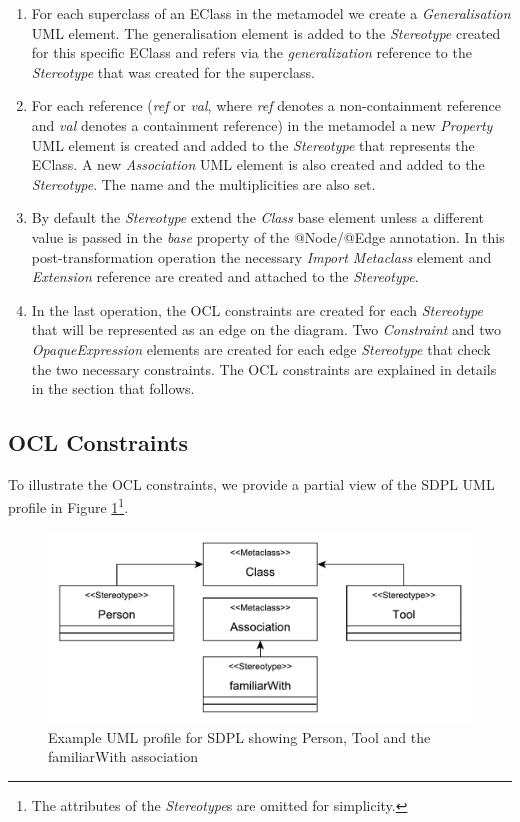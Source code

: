 \begin{enumerate}[label=\arabic*)]
	\item For each superclass of an EClass in the metamodel we create a \textit{Generalisation} UML element. 
	The generalisation element is added to the \textit{Stereotype} created for this specific EClass and refers via the \textit{generalization} reference to the \textit{Stereotype} that was created for the superclass.
	\item For each reference (\textit{ref} or \textit{val}, where \textit{ref} denotes a non-containment reference and \textit{val} denotes a containment reference) in the metamodel a new \textit{Property} UML element is created and added to the \textit{Stereotype} that represents the EClass. 
	A new \textit{Association} UML element is also created and added to the \textit{Stereotype}. The name and the multiplicities are also set.
	\item By default the \textit{Stereotype} extend the \textit{Class} base element unless a different value is passed in the \textit{base} property of the @Node/@Edge annotation. 
	In this post-transformation operation the necessary \textit{Import Metaclass} element and \textit{Extension} reference are created and attached to the \textit{Stereotype}.
	\item In the last operation, the OCL constraints are created for each \textit{Stereotype} that will be represented as an edge on the diagram. 
	Two \textit{Constraint} and two \textit{OpaqueExpression} elements are created for each edge \textit{Stereotype} that check the two necessary constraints. 
	The OCL constraints are explained in details in the section that follows.
\end{enumerate}

\subsection{OCL Constraints}
\label{sec:constraints}

To illustrate the OCL constraints, we provide a partial view of the SDPL UML profile in Figure \ref{fig:sample_profile}\footnote{The attributes of the \textit{Stereotype}s are omitted for simplicity.}.

\begin{figure}[ht!]
	\centering
	\includegraphics[width=1\textwidth]{diagrams/example_profile}
	\caption[]{Example UML profile for SDPL showing Person, Tool and the familiarWith association}
	\label{fig:sample_profile}
\end{figure}

